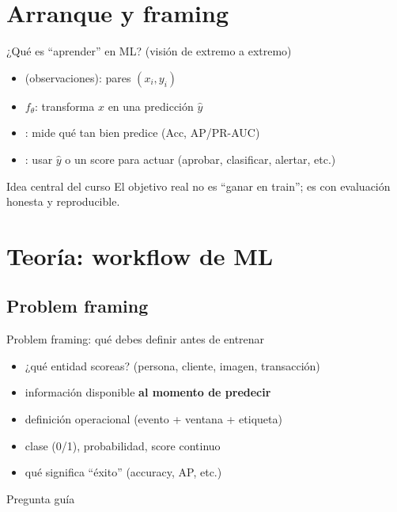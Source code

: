 \section[Arranque]{Arranque y framing}

\begin{frame}{¿Qué es “aprender” en ML? (visión de extremo a extremo)}

\begin{itemize}
  \item {} (observaciones): pares $(x_i, y_i)$
  \item {} $f_\theta$: transforma $x$ en una predicción $\hat{y}$
  \item {}: mide qué tan bien predice (Acc, AP/PR-AUC)
  \item {}: usar $\hat{y}$ o un score para actuar (aprobar, clasificar, alertar, etc.)
\end{itemize}

\begin{block}{Idea central del curso}
El objetivo real no es “ganar en train”; es  con evaluación honesta y reproducible.
\end{block}
\end{frame}

\section[Teoría]{Teoría: workflow de ML}
\subsection{Problem framing}

\begin{frame}{Problem framing: qué debes definir antes de entrenar}

\begin{itemize}
  \item {} ¿qué entidad scoreas? (persona, cliente, imagen, transacción)
  \item {} información disponible \textbf{al momento de predecir}
  \item {} definición operacional (evento + ventana + etiqueta)
  \item {} clase (0/1), probabilidad, score continuo
  \item {} qué significa “éxito” (accuracy, AP, etc.)
\end{itemize}

\begin{block}{Pregunta guía}
\end{block}
\end{frame}

